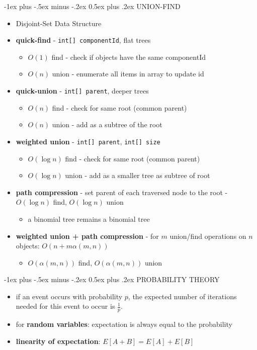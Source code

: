 \documentclass[10pt, landscape]{article}
\makeatletter
\newcommand{\code}[1]{\colorbox{gray!25!}{\lstinline|#1|}}
\renewcommand{\section}{\@startsection{section}{1}{0mm}%
                                {-1ex plus -.5ex minus -.2ex}%
                                {0.5ex plus .2ex}%
                                {\normalfont\large\bfseries}}
\makeatother
\begin{document}
\begin{multicols}{4}
\section{UNION-FIND}
\begin{itemize}
    \item Disjoint-Set Data Structure
    \item \textbf{quick-find} - \code{int[] componentId}, flat trees
    \begin{itemize}
        \item $O(1)$ find - check if objects have the same componentId
        \item $O(n)$ union - enumerate all items in array to update id
    \end{itemize}
    \item \textbf{quick-union} - \code{int[] parent}, deeper trees
    \begin{itemize}
        \item $O(n)$ find - check for same root (common parent)
        \item $O(n)$ union - add as a subtree of the root
    \end{itemize}
    \item \textbf{weighted union} - \code{int[] parent}, \code{int[] size}
    \begin{itemize}
        \item $O(\log n)$ find - check for same root (common parent)
        \item $O(\log n)$ union - add as a smaller tree as subtree of root
    \end{itemize}
    \item \textbf{path compression} - set parent of each traversed node to the root - $O(\log n)$ find, $O(\log n)$ union
    \begin{itemize}
        \item a binomial tree remains a binomial tree
    \end{itemize}
    \item \textbf{weighted union + path compression} - for $m$ union/find operations on $n$ objects: $O(n + m\alpha (m, n))$
    \begin{itemize}
        \item $O(\alpha (m, n))$ find, $O(\alpha (m, n))$ union
    \end{itemize}
\end{itemize}

\section{PROBABILITY THEORY}
\begin{itemize}
    \item if an event occurs with probability $p$, the expected number of iterations needed for this event to occur is $\frac{1}{p}$.
    \item for \textbf{random variables}: expectation is always equal to the probability
    \item \textbf{linearity of expectation}: $E[A + B] = E[A] + E[B]$
\end{itemize}


\end{multicols}
\end{document}
